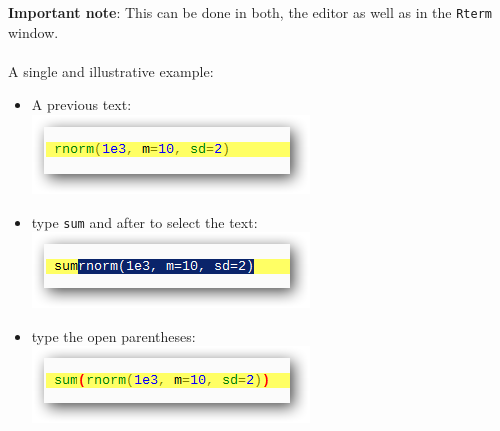 \textbf{Important note}: This can be done in both, the editor as well as in the \texttt{Rterm} window.
\\
\\
A single and illustrative example:
\begin{itemize}
  \item A previous text: \\
    \includegraphics[scale=0.50]{./res/completion_howto_01.png}
  \item type \texttt{sum} and after to select the text: \\
    \includegraphics[scale=0.50]{./res/completion_howto_02.png}
  \item type the open parentheses: \\
    \includegraphics[scale=0.50]{./res/completion_howto_03.png}
\end{itemize}

